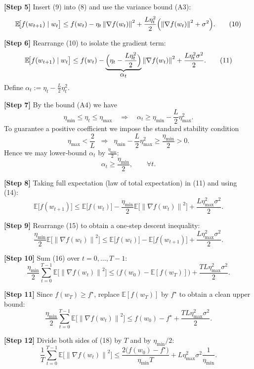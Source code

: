 \documentclass{article}
\newcommand{\EE}{\mathbb{E}}
\newcommand{\norm}[1]{\left\lVert #1 \right\rVert}
\begin{document}
\noindent\textbf{[Step 5]} Insert (9) into (8) and use the variance bound (A3):
\[
\EE\!\bigl[f(w_{t+1})\mid w_t\bigr]\le
f(w_t)-\eta_t\norm{\nabla f(w_t)}^{2}
+\frac{L\eta_t^{2}}{2}\Bigl(\norm{\nabla f(w_t)}^{2}+\sigma^{2}\Bigr).
\tag{10}
\]

\noindent\textbf{[Step 6]} Rearrange (10) to isolate the gradient term:
\[
\EE\!\bigl[f(w_{t+1})\mid w_t\bigr]\le
f(w_t)-\underbrace{\Bigl(\eta_t-\frac{L\eta_t^{2}}{2}\Bigr)}_{\displaystyle\alpha_t}
\norm{\nabla f(w_t)}^{2}
+\frac{L\eta_t^{2}\sigma^{2}}{2}.
\tag{11}
\]
Define $\alpha_t:=\eta_t-\frac{L}{2}\eta_t^{2}$.

\noindent\textbf{[Step 7]} By the bound (A4) we have
\[
\eta_{\min}\le\eta_t\le\eta_{\max}\quad\Longrightarrow\quad
\alpha_t\ge\eta_{\min}-\frac{L}{2}\eta_{\max}^{2}.
\tag{12}
\]
To guarantee a positive coefficient we impose the standard stability condition
\[
\eta_{\max}<\frac{2}{L}\;\;\Longrightarrow\;\;
\eta_{\min}-\frac{L}{2}\eta_{\max}^{2}\ge\frac{\eta_{\min}}{2}>0.
\tag{13}
\]
Hence we may lower‑bound $\alpha_t$ by $\frac{\eta_{\min}}{2}$:
\[
\alpha_t\ge\frac{\eta_{\min}}{2},\qquad\forall t.
\tag{14}
\]

\noindent\textbf{[Step 8]} Taking full expectation (law of total expectation) in (11) and using (14):
\[
\EE\!\bigl[f(w_{t+1})\bigr]\le
\EE\!\bigl[f(w_t)\bigr]
-\frac{\eta_{\min}}{2}\EE\!\bigl[\norm{\nabla f(w_t)}^{2}\bigr]
+\frac{L\eta_{\max}^{2}\sigma^{2}}{2}.
\tag{15}
\]

\noindent\textbf{[Step 9]} Rearrange (15) to obtain a one‑step descent inequality:
\[
\frac{\eta_{\min}}{2}\EE\!\bigl[\norm{\nabla f(w_t)}^{2}\bigr]
\le
\EE\!\bigl[f(w_t)\bigr]-\EE\!\bigl[f(w_{t+1})\bigr]
+\frac{L\eta_{\max}^{2}\sigma^{2}}{2}.
\tag{16}
\]

\noindent\textbf{[Step 10]} Sum (16) over $t=0,\dots,T-1$:
\[
\frac{\eta_{\min}}{2}\sum_{t=0}^{T-1}\EE\!\bigl[\norm{\nabla f(w_t)}^{2}\bigr]
\le
\bigl(f(w_0)-\EE[f(w_T)]\bigr)
+ \frac{TL\eta_{\max}^{2}\sigma^{2}}{2}.
\tag{17}
\]

\noindent\textbf{[Step 11]} Since $f(w_T)\ge f^{\star}$, replace $\EE[f(w_T)]$ by $f^{\star}$ to obtain a clean upper bound:
\[
\frac{\eta_{\min}}{2}\sum_{t=0}^{T-1}\EE\!\bigl[\norm{\nabla f(w_t)}^{2}\bigr]
\le
f(w_0)-f^{\star}
+ \frac{TL\eta_{\max}^{2}\sigma^{2}}{2}.
\tag{18}
\]

\noindent\textbf{[Step 12]} Divide both sides of (18) by $T$ and by $\eta_{\min}/2$:
\[
\frac{1}{T}\sum_{t=0}^{T-1}\EE\!\bigl[\norm{\nabla f(w_t)}^{2}\bigr]
\le
\frac{2\bigl(f(w_0)-f^{\star}\bigr)}{\eta_{\min}T}
+ L\eta_{\max}^{2}\sigma^{2}\frac{1}{\eta_{\min}}.
\tag{19}
\]
\end{document}
